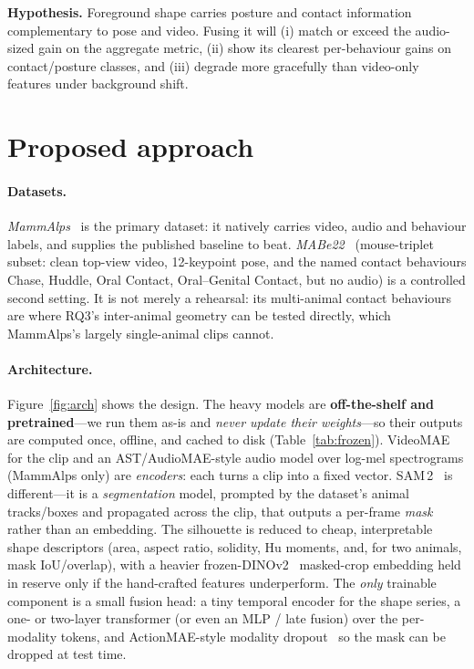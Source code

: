 \documentclass[11pt]{article}
\begin{document}
\noindent\textbf{Hypothesis.} Foreground shape carries posture and contact information complementary to pose and video. Fusing it will (i) match or exceed the audio-sized gain on the aggregate metric, (ii) show its clearest per-behaviour gains on contact/posture classes, and (iii) degrade more gracefully than video-only features under background shift.

\section{Proposed approach}
\paragraph{Datasets.} \emph{MammAlps}~\cite{mammalps} is the primary dataset: it natively carries video, audio and behaviour labels, and supplies the published baseline to beat. \emph{MABe22}~\cite{mabe22} (mouse-triplet subset: clean top-view video, 12-keypoint pose, and the named contact behaviours Chase, Huddle, Oral Contact, Oral--Genital Contact, but no audio) is a controlled second setting. It is not merely a rehearsal: its multi-animal contact behaviours are where RQ3's inter-animal geometry can be tested directly, which MammAlps's largely single-animal clips cannot.

\paragraph{Architecture.} Figure~\ref{fig:arch} shows the design. The heavy models are \textbf{off-the-shelf and pretrained}---we run them as-is and \emph{never update their weights}---so their outputs are computed once, offline, and cached to disk (Table~\ref{tab:frozen}). VideoMAE for the clip and an AST/AudioMAE-style audio model over log-mel spectrograms (MammAlps only) are \emph{encoders}: each turns a clip into a fixed vector. SAM\,2~\cite{sam2} is different---it is a \emph{segmentation} model, prompted by the dataset's animal tracks/boxes and propagated across the clip, that outputs a per-frame \emph{mask} rather than an embedding. The silhouette is reduced to cheap, interpretable shape descriptors (area, aspect ratio, solidity, Hu moments, and, for two animals, mask IoU/overlap), with a heavier frozen-DINOv2~\cite{dinov2} masked-crop embedding held in reserve only if the hand-crafted features underperform. The \emph{only} trainable component is a small fusion head: a tiny temporal encoder for the shape series, a one- or two-layer transformer (or even an MLP / late fusion) over the per-modality tokens, and ActionMAE-style modality dropout~\cite{actionmae} so the mask can be dropped at test time.
\end{document}
